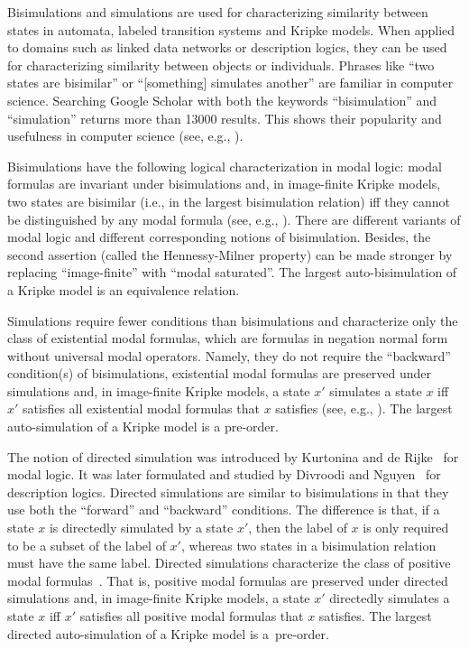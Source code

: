 \documentclass[11pt]{article}
\begin{document}
Bisimulations and simulations are used for characterizing similarity between states in automata, labeled transition systems and Kripke models. When applied to domains such as linked data networks or description logics, they can be used for characterizing similarity between objects or individuals. 
%
Phrases like ``two states are bisimilar'' or ``[something] simulates another'' are familiar in computer science. Searching Google Scholar with both the keywords ``bisimulation'' and ``simulation'' returns more than 13000 results. This shows their popularity and usefulness in computer science (see, e.g., \cite{vBenthem76,Park81,vBenthem83,vBenthem84,HennessyM85,BRV2001,Sangiorgi09}). 

Bisimulations have the following logical characterization in modal logic: modal formulas are invariant under bisimulations and, in image-finite Kripke models, two states are bisimilar (i.e., in the largest bisimulation relation) iff they cannot be distinguished by any modal formula (see, e.g., \cite{BRV2001}). There are different variants of modal logic and different corresponding notions of bisimulation. Besides, the second assertion (called the Hennessy-Milner property) can be made stronger by replacing ``image-finite'' with ``modal saturated''. The largest auto-bisimulation of a Kripke model is an equivalence relation.  

Simulations require fewer conditions than bisimulations and characterize only the class of existential modal formulas, which are formulas in negation normal form without universal modal operators. Namely, they do not require the ``backward'' condition(s) of bisimulations, existential modal formulas are preserved under simulations and, in image-finite Kripke models, a state $x'$ simulates a state $x$ iff $x'$ satisfies all existential modal formulas that $x$ satisfies (see, e.g., \cite{BRV2001}). The largest auto-simulation of a Kripke model is a pre-order.   

The notion of directed simulation was introduced by Kurtonina and de Rijke~\cite{KurtoninaR97} for modal logic. It was later formulated and studied by Divroodi and Nguyen~\cite{BSDL-P-LOGCOM} for description logics. Directed simulations are similar to bisimulations in that they use both the ``forward'' and ``backward'' conditions. The difference is that, if a state $x$ is directedly simulated by a state $x'$, then the label of $x$ is only required to be a subset of the label of $x'$, whereas two states in a bisimulation relation must have the same label. Directed simulations characterize the class of positive modal formulas~\cite{KurtoninaR97}. That is, positive modal formulas are preserved under directed simulations and, in image-finite Kripke models, a state $x'$ directedly simulates a state $x$ iff $x'$ satisfies all positive modal formulas that $x$ satisfies. The largest directed auto-simulation of a Kripke model is a~pre-order. 
\end{document}
